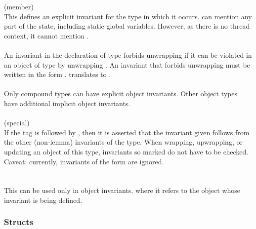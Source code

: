 \documentclass[preprint,nocopyrightspace]{sigplanconf}
\begin{document}
{{{ (member)\\
This defines an explicit invariant for the type in which it occurs.
 can mention any part of the state, including
static global variables. However, as there is no thread context, it
cannot mention \vcc{\me}.
\\\\
An invariant in the declaration of type  forbids unwrapping if
it can be violated in an object  of type  by
unwrapping . An invariant that forbids unwrapping must be
written in the form . 
 translates to 
.
\\\\
Only compound types can have explicit object invariants. Other object
types have additional implicit object invariants.
\\\\
 (special)\\
If the  tag is followed by , then it is
asserted that the invariant given follows from the other (non-lemma)
invariants of the type. When wrapping, upwrapping, or updating an
object of this type, invariants so marked do not have to be checked.
Caveat: currently,  invariants of the form
 are ignored.
\\\\
\\
This can be used only in object invariants, where it refers to the
object whose invariant is being defined.

\subsubsection{Structs}

}}}
\end{document}
